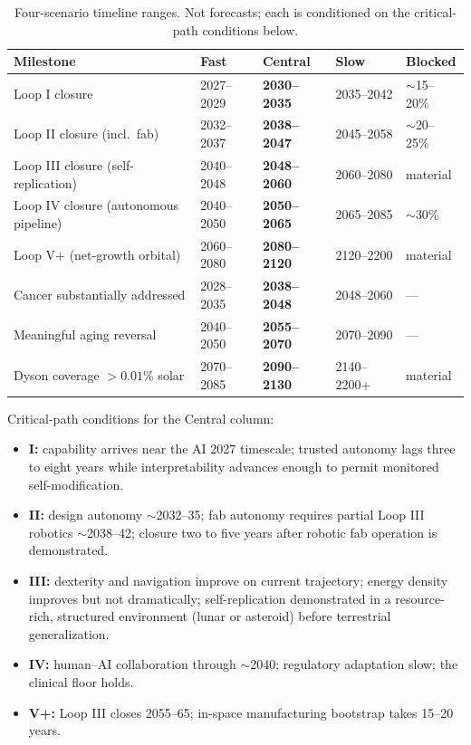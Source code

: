 \documentclass[11pt]{article}
\begin{document}
\begin{table}[h]
\centering
\footnotesize
\begin{tabular}{@{}L{4.6cm}llll@{}}
\toprule
Milestone & Fast & \textbf{Central} & Slow & Blocked \\
\midrule
Loop I closure                        & 2027--2029 & \textbf{2030--2035} & 2035--2042 & $\sim$15--20\% \\
Loop II closure (incl.\ fab)          & 2032--2037 & \textbf{2038--2047} & 2045--2058 & $\sim$20--25\% \\
Loop III closure (self-replication)   & 2040--2048 & \textbf{2048--2060} & 2060--2080 & material \\
Loop IV closure (autonomous pipeline) & 2040--2050 & \textbf{2050--2065} & 2065--2085 & $\sim$30\% \\
Loop V+ (net-growth orbital)          & 2060--2080 & \textbf{2080--2120} & 2120--2200 & material \\
Cancer substantially addressed        & 2028--2035 & \textbf{2038--2048} & 2048--2060 & --- \\
Meaningful aging reversal             & 2040--2050 & \textbf{2055--2070} & 2070--2090 & --- \\
Dyson coverage $>0.01\%$ solar        & 2070--2085 & \textbf{2090--2130} & 2140--2200+ & material \\
\bottomrule
\end{tabular}
\caption{Four-scenario timeline ranges. Not forecasts; each is conditioned on the critical-path conditions below.}
\end{table}

Critical-path conditions for the Central column:

\begin{itemize}
\item \textbf{I:} capability arrives near the AI 2027 timescale; trusted autonomy lags three to eight years while interpretability advances enough to permit monitored self-modification.
\item \textbf{II:} design autonomy $\sim$2032--35; fab autonomy requires partial Loop III robotics $\sim$2038--42; closure two to five years after robotic fab operation is demonstrated.
\item \textbf{III:} dexterity and navigation improve on current trajectory; energy density improves but not dramatically; self-replication demonstrated in a resource-rich, structured environment (lunar or asteroid) before terrestrial generalization.
\item \textbf{IV:} human--AI collaboration through $\sim$2040; regulatory adaptation slow; the clinical floor holds.
\item \textbf{V+:} Loop III closes 2055--65; in-space manufacturing bootstrap takes 15--20 years.
\end{itemize}
\end{document}
